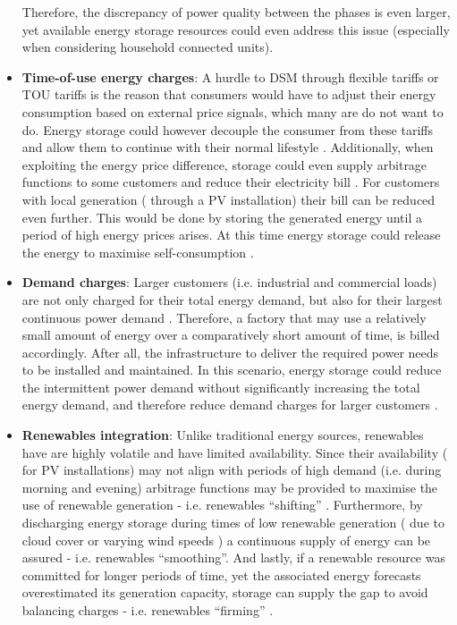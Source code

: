\begin{itemize}
Therefore, the discrepancy of power quality between the phases is even larger, yet available energy storage resources could even address this issue \cite{Miret2009} (especially when considering household connected units).
\item
\textbf{Time-of-use energy charges}: A hurdle to DSM through flexible tariffs or TOU tariffs is the reason that consumers would have to adjust their energy consumption based on external price signals, which many are do not want to do.
Energy storage could however decouple the consumer from these tariffs and allow them to continue with their normal lifestyle \cite{Khani2014}.
Additionally, when exploiting the energy price difference, storage could even supply arbitrage functions to some customers and reduce their electricity bill \cite{Nair2010a}.
For customers with local generation ( through a PV installation) their bill can be reduced even further.
This would be done by storing the generated energy until a period of high energy prices arises.
At this time energy storage could release the energy to maximise self-consumption \cite{Luthander2016}.
\item
\textbf{Demand charges}: Larger customers (i.e. industrial and commercial loads) are not only charged for their total energy demand, but also for their largest continuous power demand \cite{Oudalov2007, Mackey2013}.
Therefore, a factory that may use a relatively small amount of energy over a comparatively short amount of time, is billed accordingly.
After all, the infrastructure to deliver the required power needs to be installed and maintained.
In this scenario, energy storage could reduce the intermittent power demand without significantly increasing the total energy demand, and therefore reduce demand charges for larger customers \cite{Aghaei2013}.
\item
\textbf{Renewables integration}: Unlike traditional energy sources, renewables have are highly volatile and have limited availability.
Since their availability ( for PV installations) may not align with periods of high demand (i.e. during morning and evening) arbitrage functions may be provided to maximise the use of renewable generation - i.e. renewables ``shifting'' \cite{Zakeri2015}.
Furthermore, by discharging energy storage during times of low renewable generation ( due to cloud cover or varying wind speeds \cite{Jewell1987}) a continuous supply of energy can be assured - i.e. renewables ``smoothing''.
And lastly, if a renewable resource was committed for longer periods of time, yet the associated energy forecasts overestimated its generation capacity, storage can supply the gap to avoid balancing charges - i.e. renewables ``firming'' \cite{Chakraborty2012}.
\end{itemize}

